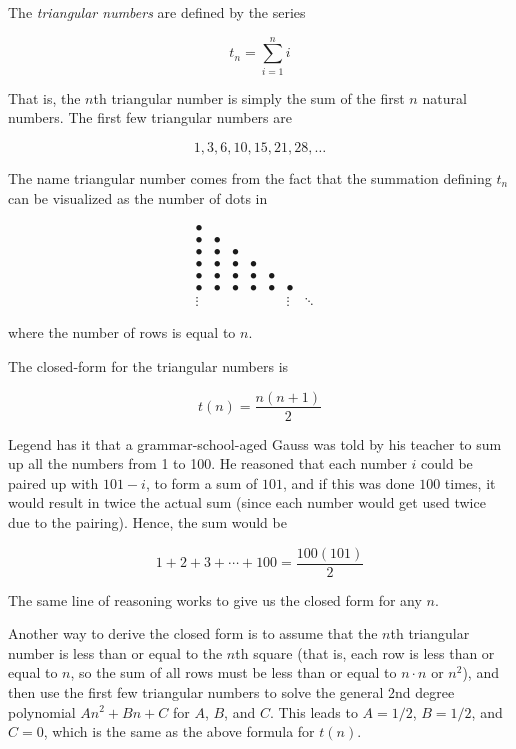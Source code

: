 \documentclass[12pt]{article}
\begin{document}
The \emph{triangular numbers} are defined by the series

$$ t_n = \sum_{i=1}^n i $$

That is, the $n$th triangular number is simply the sum of the first $n$ natural numbers.  The first few triangular numbers are

$$ 1, 3, 6, 10, 15, 21, 28, \ldots $$

The name triangular number comes from the fact that the summation defining $t_n$ can be visualized as the number of dots in

$$ \begin{matrix}
 \bullet & & & & & & & \\
 \bullet & \bullet & & & & & & \\
 \bullet & \bullet & \bullet & & & & & \\
 \bullet & \bullet & \bullet & \bullet & & &  & \\
 \bullet & \bullet & \bullet & \bullet & \bullet & & & \\
 \bullet & \bullet & \bullet & \bullet & \bullet & \bullet & & \\
 \vdots &  &  &  &  & \vdots & \ddots & 
\end{matrix} $$

where the number of rows is equal to $n$.  

The closed-form for the triangular numbers is 

$$ t(n) = \frac{n(n+1)}{2} $$

Legend has it that a grammar-school-aged Gauss was told by his teacher to sum up all the numbers from 1 to 100.  He reasoned that each number $i$ could be paired up with $101-i$, to form a sum of $101$, and if this was done $100$ times, it would result in twice the actual sum (since each number would get used twice due to the pairing).  Hence, the sum would be 

$$ 1+2+3+\cdots+100 = \frac{100(101)}{2} $$

The same line of reasoning works to give us the closed form for any $n$.

Another way to derive the closed form is to assume that the $n$th triangular number is less than or equal to the $n$th square (that is, each row is less than or equal to $n$, so the sum of all rows must be less than or equal to $n\cdot n$ or $n^2$), and then use the first few triangular numbers to solve the general 2nd degree polynomial $An^2 + Bn + C$ for $A$, $B$, and $C$.  This leads to $A=1/2$, $B=1/2$, and $C=0$, which is the same as the above formula for $t(n)$.
\end{document}
